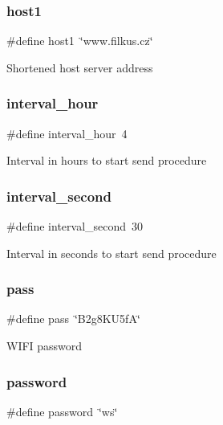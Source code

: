 \subsubsection{\texorpdfstring{host1}{host1}}
{\footnotesize\ttfamily \#define host1~\char`\"{}www.\+filkus.\+cz\char`\"{}}

Shortened host server address \mbox{\label{_w_s_8ino_a4e07ce7aef83b2e94bd353d77029423e}} 
\subsubsection{\texorpdfstring{interval\+\_\+hour}{interval\_hour}}
{\footnotesize\ttfamily \#define interval\+\_\+hour~4}

Interval in hours to start send procedure \mbox{\label{_w_s_8ino_a0a56e85c196bfb2b3bf61abe7f007541}} 
\subsubsection{\texorpdfstring{interval\+\_\+second}{interval\_second}}
{\footnotesize\ttfamily \#define interval\+\_\+second~30}

Interval in seconds to start send procedure \mbox{\label{_w_s_8ino_a9f2587d1070b8924b276ba83988d3667}} 
\subsubsection{\texorpdfstring{pass}{pass}}
{\footnotesize\ttfamily \#define pass~\char`\"{}B2g8\+K\+U5fA\char`\"{}}

W\+I\+FI password \mbox{\label{_w_s_8ino_ae59dfb8ffddb9128834034516c45e7ce}} 
\subsubsection{\texorpdfstring{password}{password}}
{\footnotesize\ttfamily \#define password~\char`\"{}ws\char`\"{}}

